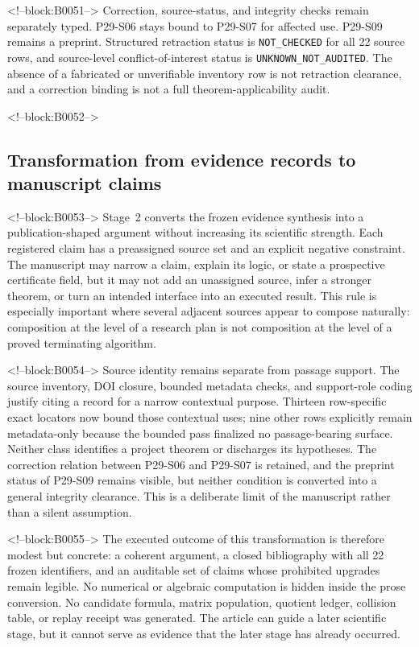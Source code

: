 \documentclass[11pt,a4paper]{article}
\begin{document}
<!--block:B0051-->
Correction, source-status, and integrity checks remain separately typed. P29-S06 stays bound to P29-S07 for affected use. P29-S09 remains a preprint. Structured retraction status is \texttt{NOT\_CHECKED} for all 22 source rows, and source-level conflict-of-interest status is \texttt{UNKNOWN\_NOT\_AUDITED}. The absence of a fabricated or unverifiable inventory row is not retraction clearance, and a correction binding is not a full theorem-applicability audit.

<!--block:B0052-->
\subsection{Transformation from evidence records to manuscript claims}

<!--block:B0053-->
Stage~2 converts the frozen evidence synthesis into a publication-shaped argument without increasing its scientific strength. Each registered claim has a preassigned source set and an explicit negative constraint. The manuscript may narrow a claim, explain its logic, or state a prospective certificate field, but it may not add an unassigned source, infer a stronger theorem, or turn an intended interface into an executed result. This rule is especially important where several adjacent sources appear to compose naturally: composition at the level of a research plan is not composition at the level of a proved terminating algorithm.

<!--block:B0054-->
Source identity remains separate from passage support. The
source inventory, DOI closure, bounded metadata checks, and support-role coding
justify citing a record for a narrow contextual purpose. Thirteen row-specific exact
locators now bound those contextual uses; nine other rows explicitly remain
metadata-only because the bounded pass finalized no passage-bearing surface. Neither
class identifies a project theorem or discharges its hypotheses. The correction
relation between P29-S06 and P29-S07 is retained, and the preprint status of P29-S09
remains visible, but neither condition is converted into a general integrity
clearance. This is a deliberate limit of the manuscript rather than a silent
assumption.

<!--block:B0055-->
The executed outcome of this transformation is therefore modest but concrete: a coherent argument, a closed bibliography with all 22 frozen identifiers, and an auditable set of claims whose prohibited upgrades remain legible. No numerical or algebraic computation is hidden inside the prose conversion. No candidate formula, matrix population, quotient ledger, collision table, or replay receipt was generated. The article can guide a later scientific stage, but it cannot serve as evidence that the later stage has already occurred.
\end{document}
